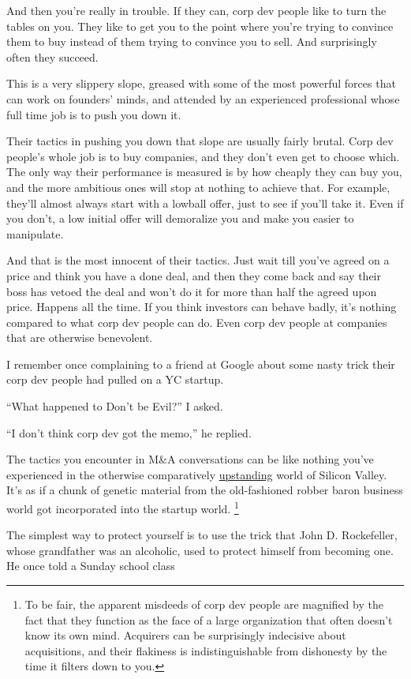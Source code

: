 \documentclass[12pt]{book}
\begin{document}
And then you're really in trouble. If they can, corp dev people like to
turn the tables on you. They like to get you to the point where you're
trying to convince them to buy instead of them trying to convince you to
sell. And surprisingly often they succeed.

This is a very slippery slope, greased with some of the most powerful
forces that can work on founders' minds, and attended by an experienced
professional whose full time job is to push you down it.

Their tactics in pushing you down that slope are usually fairly brutal.
Corp dev people's whole job is to buy companies, and they don't even get
to choose which. The only way their performance is measured is by how
cheaply they can buy you, and the more ambitious ones will stop at
nothing to achieve that. For example, they'll almost always start with a
lowball offer, just to see if you'll take it. Even if you don't, a low
initial offer will demoralize you and make you easier to manipulate.

And that is the most innocent of their tactics. Just wait till you've
agreed on a price and think you have a done deal, and then they come
back and say their boss has vetoed the deal and won't do it for more
than half the agreed upon price. Happens all the time. If you think
investors can behave badly, it's nothing compared to what corp dev
people can do. Even corp dev people at companies that are otherwise
benevolent.

I remember once complaining to a friend at Google about some nasty trick
their corp dev people had pulled on a YC startup.

``What happened to Don't be Evil?'' I asked.

``I don't think corp dev got the memo,'' he replied.

The tactics you encounter in M\&A conversations can be like nothing
you've experienced in the otherwise comparatively
\href{mean.html}{upstanding} world of Silicon Valley. It's as if a chunk
of genetic material from the old-fashioned robber baron business world
got incorporated into the startup world. \footnote{To be fair, the apparent misdeeds of corp dev people are
magnified by the fact that they function as the face of a large
organization that often doesn't know its own mind. Acquirers can be
surprisingly indecisive about acquisitions, and their flakiness is
indistinguishable from dishonesty by the time it filters down to you.}

The simplest way to protect yourself is to use the trick that John D.
Rockefeller, whose grandfather was an alcoholic, used to protect himself
from becoming one. He once told a Sunday school class
\end{document}

